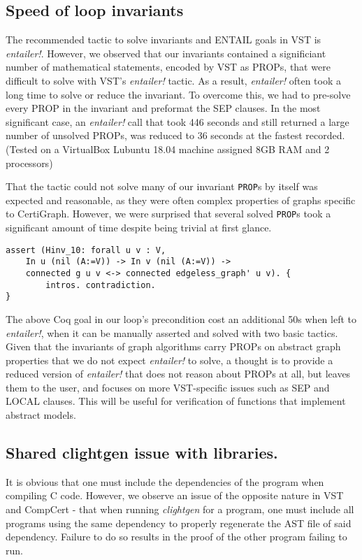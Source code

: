 \subsection{Speed of loop invariants}
The recommended tactic to solve invariants and ENTAIL goals in VST is \textit{entailer!}. However, we observed that our invariants contained a significiant number of mathematical statements, encoded by VST as PROPs, that were difficult to solve with VST's \textit{entailer!} tactic. As a result, \textit{entailer!} often took a long time to solve or reduce the invariant. To overcome this, we had to pre-solve every PROP in the invariant and preformat the SEP clauses. In the most significant case, an \textit{entailer!} call that took 446 seconds and still returned a large number of unsolved PROPs, was reduced to 36 seconds at the fastest recorded. (Tested on a VirtualBox Lubuntu 18.04 machine assigned 8GB RAM and 2 processors)

That the tactic could not solve many of our invariant \texttt{PROP}s by itself was expected and reasonable, as they were often complex properties of graphs specific to CertiGraph. However, we were surprised that several solved \texttt{PROP}s took a significant amount of time despite being trivial at first glance.
\begin{lstlisting}
assert (Hinv_10: forall u v : V,
	In u (nil (A:=V)) -> In v (nil (A:=V)) ->
	connected g u v <-> connected edgeless_graph' u v). {
		intros. contradiction.
}
\end{lstlisting}
The above Coq goal in our loop's precondition cost an additional 50s when left to \textit{entailer!}, when it can be manually asserted and solved with two basic tactics.
\newline\newline
Given that the invariants of graph algorithms carry PROPs on abstract graph properties that we do not expect \textit{entailer!} to solve, a thought is to provide a reduced version of \textit{entailer!} that does not reason about PROPs at all, but leaves them to the user, and focuses on more VST-specific issues such as SEP and LOCAL clauses. This will be useful for verification of functions that implement abstract models.

\subsection{Shared clightgen issue with libraries.} It is obvious that one must include the dependencies of the program when compiling C code. However, we observe an issue of the opposite nature in VST and CompCert - that when running \textit{clightgen} for a program, one must include all programs using the same dependency to properly regenerate the AST file of said dependency. Failure to do so results in the proof of the other program failing to run.

